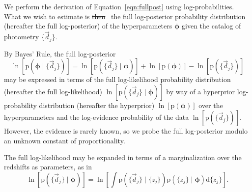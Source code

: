 \documentclass[iop]{emulateapj}
\newcommand{\todo}[3]{{\color{#2}\emph{#1}: #3}}
\newcommand{\aim}[1]{\todo{AIM}{red}{#1}}
\newcommand{\new}[2]{{\color{red}\sout{#1}}\ {\color{blue}{#2}}}%
\newcommand{\Eq}[1]{Equation~\ref{#1}}
\newcommand{\data}{\ensuremath{\vec{d}}}
\newcommand{\pr}[1]{\ensuremath{\mathrm{p}(#1)}}
\newcommand{\gvn}{\mid}
\newcommand{\integral}[2]{\ensuremath{\int #1 \mathrm{d} #2}}
\newcommand{\bvec}[1]{\ensuremath{\boldsymbol{#1}}}
\newcommand{\ndphi}{\bvec{\phi}}
\begin{document}

\appendix

\section{}%

We perform the derivation of \Eq{eqn:fullpost} using log-probabilities.  
What we wish to estimate is \new{then}{} the full log-posterior probability distribution (hereafter the full log-posterior) of the hyperparameters $\ndphi$ given the catalog of photometry $\{\data_{j}\}$.

By Bayes' Rule, the full log-posterior
\begin{equation}
\label{eqn:basicbayes}
\ln[\pr{\ndphi \gvn \{\data_{j}\}}] = \ln[\pr{\{\data_{j}\} \gvn \ndphi}] + \ln[\pr{\ndphi}] - \ln[\pr{\{\data_{j}\}}]
\end{equation}
may be expressed in terms of the full log-likelihood probability distribution (hereafter the full log-likelihood) $\ln[\pr{\{\data_{j}\} \gvn \ndphi}]$ by way of a hyperprior log-probability distribution (hereafter the hyperprior) $\ln[\pr{\ndphi}]$ over the hyperparameters and the log-evidence probability of the data $\ln[\pr{\{\data_{j}\}}]$.
However, the evidence is rarely known, so we probe the full log-posterior modulo an unknown constant of proportionality.

The full log-likelihood may be expanded in terms of a marginalization over the redshifts as parameters, as in 
\begin{equation}
\label{eqn:marginalize}
\ln[\pr{\{\data_{j}\} \gvn \ndphi}] = \ln\left[\integral{\pr{\{\data_{j}\} \gvn \{z_{j}\}} \pr{\{z_{j}\} \gvn \ndphi}}{\{z_{j}\}}\right].
\end{equation}
\end{document}
